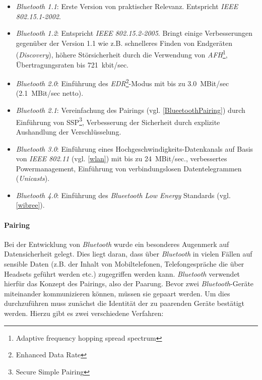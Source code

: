                \begin{itemize}
                    \item{\emph{Bluetooth 1.1}:} Erste Version von praktischer Relevanz. Entspricht 
                                          \emph{IEEE 802.15.1-2002}.
                    \item{\emph{Bluetooth 1.2}:} Entspricht \emph{IEEE 802.15.2-2005}. Bringt einige Verbesserungen
                                          gegenüber der Version 1.1 wie z.B. schnelleres Finden
                                          von Endgeräten (\emph{Discovery}), höhere Störsicherheit durch
                                          die Verwendung von \emph{AFH}\footnote{Adaptive frequency hopping spread spectrum},
                                          Übertragungsraten bis 721~kbit/sec.
                    \item{\emph{Bluetooth 2.0}:} Einführung des \emph{EDR}\footnote{Enhanced Data Rate}-Modus mit bis zu
                                          3.0~MBit/sec (2.1~MBit/sec netto).
                    \item{\emph{Bluetooth 2.1}:} Vereinfachung des Pairings (vgl. \ref{BlueetoothPairing}) durch 
                                          Einführung von SSP\footnote{Secure Simple Pairing}, Verbesserung
                                          der Sicherheit durch explizite Aushandlung der Verschlüsselung.
                    \item{\emph{Bluetooth 3.0}:} Einführung eines Hochgeschwindigkeits-Datenkanals auf Basis von
                                          \emph{IEEE 802.11} (vgl. \ref{wlan}) mit bis zu 24~MBit/sec., verbessertes
                                          Powermanagement, Einführung von verbindungslosen Datentelegrammen
                                          (\emph{Unicasts}).
                    \item{\emph{Bluetooth 4.0}:} Einführung des \textsl{Blueetooth Low Energy} Standards (vgl. \ref{wibree}).
                \end{itemize}

            \paragraph{Pairing}\label{BluetoothPairing}
                Bei der Entwicklung von \emph{Bluetooth} wurde ein besonderes Augenmerk auf Datensicherheit gelegt. 
                Dies liegt daran, dass über \emph{Bluetooth} in vielen Fällen auf sensible Daten (z.B. der Inhalt
                von Mobiltelefonen, Telefongespräche die über Headsets geführt werden etc.) zugegriffen
                werden kann. \emph{Bluetooth} verwendet hierfür das Konzept des Pairings, also der Paarung. Bevor zwei 
                \emph{Bluetooth}-Geräte miteinander kommunizieren können, müssen sie gepaart werden. Um dies 
                durchzuführen muss zunächst die Identität der zu paarenden Geräte bestätigt werden.
                Hierzu gibt es zwei verschiedene Verfahren:

